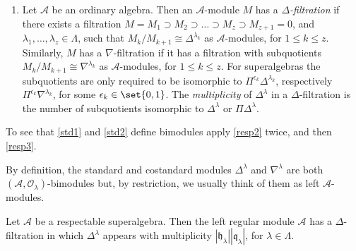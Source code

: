 \documentclass[a4paper,11pt]{amsart}
\numberwithin{equation}{subsection}
\theoremstyle{definition}
\theoremstyle{theorem}
\theoremstyle{remark}
\newcommand\CA{\mathcal{A}}
\newcommand\CO{\mathcal{O}}
\newcommand\hlam[1][\lambda]{\mathfrak{h}_{#1}}
\newcommand\qlam[1][\lambda]{\mathfrak{q}_{#1}}
\newcommand\Olam[1][\lambda]{\CO_{#1}}
\begin{document}
\begin{Definition}
\begin{enumerate}[series=Defstd, label=(\alph*), ref=\autoref{D:Standard}.(\alph*)]
   \item Let $\CA$ be an ordinary algebra. Then an $\CA$-module $M$ has a \emph{$\Delta$-filtration} if there exists a
   filtration $M=M_1\supset M_2\supset\dots\supset M_z\supset M_{z+1}=0$, and
   $\lambda_1,\dots,\lambda_z\in\Lambda$, such that
   $M_k/M_{k+1}\cong\Delta^{\lambda_k}$ as $\CA$-modules, for $1\le k\le z$.
   Similarly, $M$ has a $\nabla$-filtration if it has a filtration with
   subquotients $M_k/M_{k+1}\cong\nabla^{\lambda_k}$ as $\CA$-modules,
   for $1\le k\le z$. For superalgebras the subquotients are only required to be isomorphic to
   $\Pi^{\epsilon_k}\Delta^{\lambda_k}$, respectively $\Pi^{\epsilon_k}\nabla^{\lambda_k}$, for some
   $\epsilon_k\in\set{0,1}$. The \emph{multiplicity} of $\Delta^\lambda$
   in a $\Delta$-filtration is the number of
   subquotients isomorphic to $\Delta^\lambda$ or $\Pi\Delta^\lambda$.
   \end{enumerate}
   \end{Definition}

  \begin{Remark}  To see that  \autoref{std1} and
  \autoref{std2} define bimodules apply \autoref{resp2} twice, and then \autoref{resp3}.
  \end{Remark}

  By definition, the standard and costandard modules $\Delta^\lambda$
  and $\nabla^\lambda$ are both $(\CA,\Olam)$-bimodules but, by
  restriction, we usually think of them as left $\CA$-modules.

  \begin{Lemma}\label{L:DeltaFiltration}
    Let $\CA$ be a respectable superalgebra. Then the left regular module $\CA$ has a
    $\Delta$-filtration in which $\Delta^\lambda$ appears with multiplicity $|\hlam||\qlam|$, for
    $\lambda\in\Lambda$.
  \end{Lemma}
\end{document}
